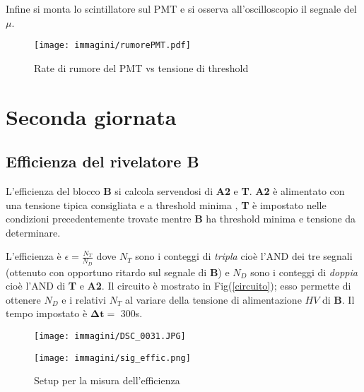 \documentclass[12pt,a4paper,openright,twoside]{article}
\numberwithin{equation}{section} %
\begin{document}
Infine si monta lo scintillatore sul PMT e si osserva all'oscilloscopio il segnale del $\mu$.

\pagebreak


\begin{figure}[hbtp]
\centering
\texttt{[image: immagini/rumorePMT.pdf]}
\caption{Rate di rumore del PMT vs tensione di threshold}
\label{rumore}
\end{figure}

\section{Seconda giornata}


\subsection{Efficienza del rivelatore \textbf{B}} \label{effpar}

L'efficienza del blocco \textbf{B} si calcola servendosi di \textbf{A2} e \textbf{T}. \textbf{A2} è alimentato con una tensione tipica consigliata e a threshold minima , \textbf{T} è impostato nelle condizioni precedentemente trovate mentre \textbf{B} ha threshold minima e tensione da determinare. 

L'efficienza è $\epsilon=\frac{N_T}{N_D}$ dove $N_T$ sono i conteggi di \textit{tripla} cioè l'AND dei tre segnali (ottenuto con opportuno ritardo sul segnale di \textbf{B}) e $N_D$ sono i conteggi di \textit{doppia} cioè l'AND di \textbf{T} e \textbf{A2}. Il circuito è mostrato in Fig(\ref{circuito}); esso permette di ottenere $N_D$ e i relativi $N_T$ al variare della tensione di alimentazione $HV$ di \textbf{B}. Il tempo impostato è $\mathbf{\Delta t =}$ 300s.
\begin{figure}[htbp]
\begin{center}
\begin{minipage}[c]{.45\textwidth}
\texttt{[image: immagini/DSC\_0031.JPG]}
\label{circuito}
\end{minipage}%
\hspace{30mm}%
\begin{minipage}[c]{0.3\textwidth}
\texttt{[image: immagini/sig\_effic.png]}
\end{minipage}
\caption{Setup per la misura dell'efficienza\label{eff}}
\end{center}
\end{figure}
\end{document}
